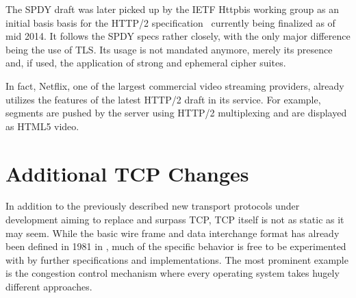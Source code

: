The SPDY draft was later picked up by the \gls{IETF} Httpbis working group as an initial basis basis for the \gls{HTTP}/2 specification~\cite{http20draft} currently being finalized as of mid 2014. It follows the SPDY specs rather closely, with the only major difference being the use of \gls{TLS}. Its usage is not mandated anymore, merely its presence and, if used, the application of strong and ephemeral cipher suites.

In fact, Netflix, one of the largest commercial video streaming providers, already utilizes the features of the latest \gls{HTTP}/2 draft in its service. For example, segments are pushed by the server using \gls{HTTP}/2 multiplexing and are displayed as \gls{HTML}5 video.


\section{Additional TCP Changes}

In addition to the previously described new transport protocols under development aiming to replace and surpass \gls{TCP}, \gls{TCP} itself is not as static as it may seem. While the basic wire frame and data interchange format has already been defined in 1981 in \cite{rfc793}, much of the specific behavior is free to be experimented with by further specifications and implementations. The most prominent example is the congestion control mechanism where every operating system takes hugely different approaches.


